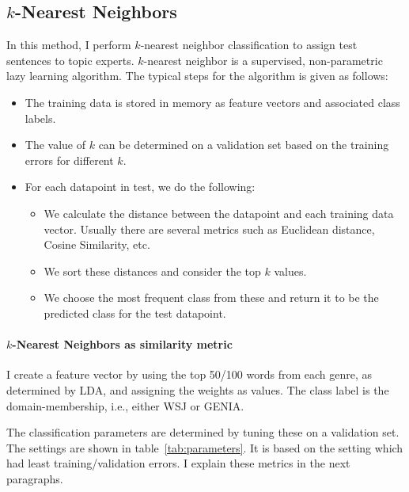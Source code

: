 \subsection{$k$-Nearest Neighbors}

In this method, I perform $k$-nearest neighbor classification to assign test sentences to topic experts. 
$k$-nearest neighbor is a supervised, non-parametric lazy learning algorithm. The typical steps for the algorithm is given as follows:

\begin{itemize}
    \item  The training data is stored in memory as feature vectors and associated class labels.
    \item The value of $k$ can be determined on a validation set based on the training errors for different $k$.
    \item For each datapoint in test, we do the following:
    \begin{itemize}
        \item We calculate the distance between the datapoint and each training data vector. Usually there are several metrics such as Euclidean distance, Cosine Similarity, etc.
        \item We sort these distances and consider the top $k$ values. 
        \item We choose the most frequent class from these and return it to be the predicted class for the test datapoint.
    \end{itemize}
\end{itemize}

\paragraph*{$k$-Nearest Neighbors as similarity metric}
I create a feature vector by using the top 50/100 words from each genre, as determined by LDA, and assigning the weights as values. The class label is the domain-membership, i.e., either WSJ or GENIA.

The classification parameters are determined by tuning these on a validation set. The settings are shown in table~\ref{tab:parameters}. It is based on the setting which had least training/validation errors. I explain these metrics in the next paragraphs.

